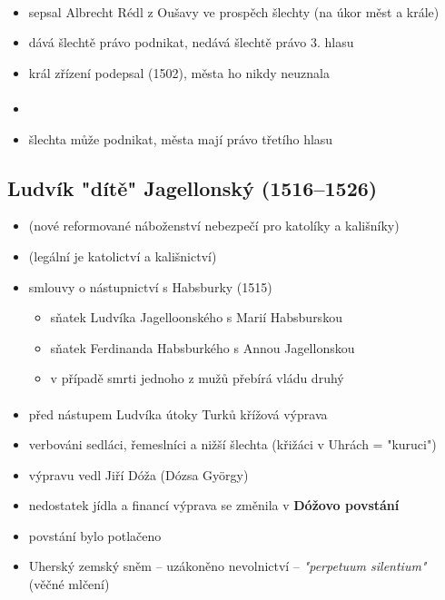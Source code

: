 \paragraph{}
\begin{itemize}
\item sepsal Albrecht Rédl z Oušavy ve prospěch šlechty (na úkor měst a krále)
\item dává šlechtě právo podnikat, nedává šlechtě právo 3. hlasu
\item král zřízení podepsal (1502), města ho nikdy neuznala
\end{itemize}

\paragraph{}
\begin{itemize}
\item[\ra] 
\item šlechta může podnikat, města mají právo třetího hlasu
\end{itemize}

\subsection{Ludvík "dítě" Jagellonský (1516--1526)}
\begin{itemize}
\item {} (nové reformované náboženství \ra nebezpečí pro katolíky a kališníky)
\item {} (legální je katolictví a kališnictví)
\item smlouvy o nástupnictví s Habsburky (1515)
	\begin{itemize}
	\item sňatek Ludvíka Jagelloonského s Marií Habsburskou
	\item sňatek Ferdinanda Habsburkého s Annou Jagellonskou
	\item v případě smrti jednoho z mužů přebírá vládu druhý
	\end{itemize}
\end{itemize}

\paragraph{}
\begin{itemize}
\item před nástupem Ludvíka útoky Turků \ra křížová výprava
\item verbováni sedláci, řemeslníci a nižší šlechta (křižáci v Uhrách = "kuruci")
\item výpravu vedl Jiří Dóža (Dózsa György)
\item nedostatek jídla a financí \ra výprava se změnila v \textbf{Dóžovo povstání}
\item povstání bylo potlačeno
\item Uherský zemský sněm -- uzákoněno nevolnictví -- \textit{"perpetuum silentium"} (věčné mlčení)
\end{itemize}

